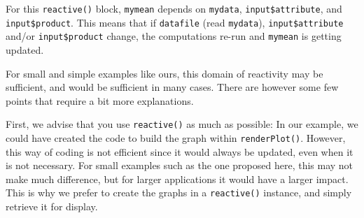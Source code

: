 \documentclass[
]{krantz}
\makeatletter
\newenvironment{Shaded}{\begin{snugshade}}{\end{snugshade}}
\newcommand{\AttributeTok}[1]{\textcolor[rgb]{0.61,0.61,0.61}{#1}}
\newcommand{\DecValTok}[1]{\textcolor[rgb]{0.06,0.06,0.06}{#1}}
\newcommand{\FunctionTok}[1]{\textcolor[rgb]{0,0,0}{#1}}
\newcommand{\NormalTok}[1]{#1}
\newcommand{\OtherTok}[1]{\textcolor[rgb]{0.37,0.37,0.37}{#1}}
\newcommand{\SpecialCharTok}[1]{\textcolor[rgb]{0,0,0}{#1}}
\newcommand{\StringTok}[1]{\textcolor[rgb]{0.5,0.5,0.5}{#1}}
\newenvironment{kframe}{%
\medskip{}
\setlength{\fboxsep}{.8em}
 \def\at@end@of@kframe{}%
 \ifinner\ifhmode%
  \def\at@end@of@kframe{\end{minipage}}%
  \begin{minipage}{\columnwidth}%
 \fi\fi%
 \def\FrameCommand##1{\hskip\@totalleftmargin \hskip-\fboxsep
 \colorbox{shadecolor}{##1}\hskip-\fboxsep
     \hskip-\linewidth \hskip-\@totalleftmargin \hskip\columnwidth}%
 \MakeFramed {\advance\hsize-\width
   \@totalleftmargin\z@ \linewidth\hsize
   \@setminipage}}%
 {\par\unskip\endMakeFramed%
 \at@end@of@kframe}
\renewenvironment{Shaded}{\begin{kframe}}{\end{kframe}}
\makeatother
\begin{document}
\begin{Shaded}
\end{Shaded}

For this \texttt{reactive()} block, \texttt{mymean} depends on \texttt{mydata}, \texttt{input\$attribute}, and \texttt{input\$product}. This means that if \texttt{datafile} (read \texttt{mydata}), \texttt{input\$attribute} and/or \texttt{input\$product} change, the computations re-run and \texttt{mymean} is getting updated.

For small and simple examples like ours, this domain of reactivity may be sufficient, and would be sufficient in many cases. There are however some few points that require a bit more explanations.

First, we advise that you use \texttt{reactive()} as much as possible: In our example, we could have created the code to build the graph within \texttt{renderPlot()}. However, this way of coding is not efficient since it would always be updated, even when it is not necessary. For small examples such as the one proposed here, this may not make much difference, but for larger applications it would have a larger impact. This is why we prefer to create the graphs in a \texttt{reactive()} instance, and simply retrieve it for display.
\end{document}
